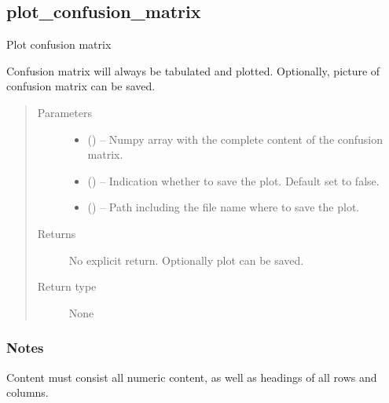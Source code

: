 \documentclass[letterpaper,10pt,english]{sphinxmanual}
\begin{document}
\subsection{plot\_confusion\_matrix}
\label{\detokenize{api/ucf.plot_confusion_matrix:plot-confusion-matrix}}\label{\detokenize{api/ucf.plot_confusion_matrix::doc}}

\begin{fulllineitems}
\label{\detokenize{api/ucf.plot_confusion_matrix:ucf.plot_confusion_matrix}}
Plot confusion matrix

Confusion matrix will always be tabulated and plotted. Optionally,
picture of confusion matrix can be saved.
\begin{quote}\begin{description}
\item[{Parameters}] \leavevmode\begin{itemize}
\item {} 
 () -- Numpy array with the complete content of the confusion matrix.

\item {} 
 () -- Indication whether to save the plot. Default set to false.

\item {} 
 () -- Path including the file name where to save the plot.

\end{itemize}

\item[{Returns}] \leavevmode
No explicit return. Optionally plot can be saved.

\item[{Return type}] \leavevmode
None

\end{description}\end{quote}
\subsubsection*{Notes}

Content must consist all numeric content, as well as headings of
all rows and columns.

\end{fulllineitems}
\end{document}
